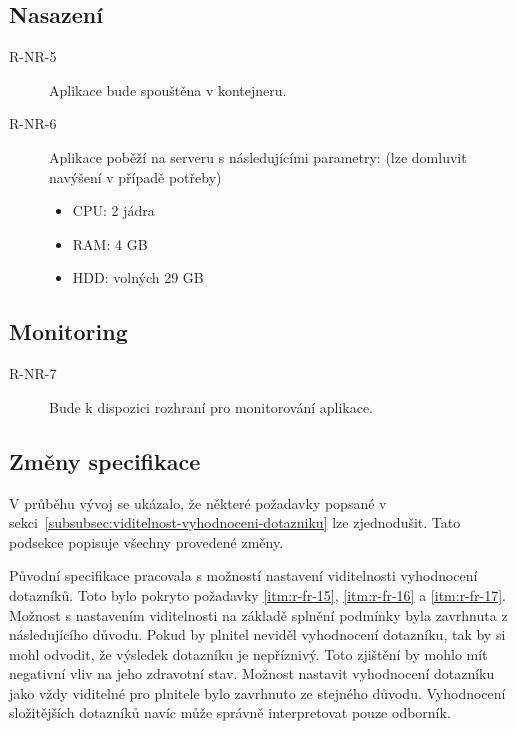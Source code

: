 \subsection{Nasazení}\label{subsec:deployment}

\begin{description}
    \item[R-NR-5]
    Aplikace bude spouštěna v kontejneru.
    \item[R-NR-6]
    Aplikace poběží na serveru s následujícími parametry: (lze domluvit navýšení v případě potřeby)

    \begin{itemize}
        \item
        CPU: 2 jádra
        \item
        RAM: 4 GB
        \item
        HDD: volných 29 GB
    \end{itemize}
\end{description}

\subsection{Monitoring}\label{subsec:monitoring}

\begin{description}
    \item[R-NR-7]
    Bude k dispozici rozhraní pro monitorování aplikace.
\end{description}

\subsection{Změny specifikace}\label{subsec:zmeny-specifikace}

V průběhu vývoj se ukázalo, že některé požadavky popsané v sekci~\ref{subsubsec:viditelnost-vyhodnoceni-dotazniku} lze zjednodušit.
Tato podsekce popisuje všechny provedené změny.

Původní specifikace pracovala s možností nastavení viditelnosti vyhodnocení dotazníků.
Toto bylo pokryto požadavky \ref{itm:r-fr-15}, \ref{itm:r-fr-16} a \ref{itm:r-fr-17}.
Možnost s nastavením viditelnosti na základě splnění podmínky byla zavrhnuta z následujícího důvodu.
Pokud by plnitel neviděl vyhodnocení dotazníku, tak by si mohl odvodit, že výsledek dotazníku je nepříznivý.
Toto zjištění by mohlo mít negativní vliv na jeho zdravotní stav.
Možnost nastavit vyhodnocení dotazníku jako vždy viditelné pro plnitele bylo zavrhnuto ze stejného důvodu.
Vyhodnocení složitějších dotazníků navíc může správně interpretovat pouze odborník.

